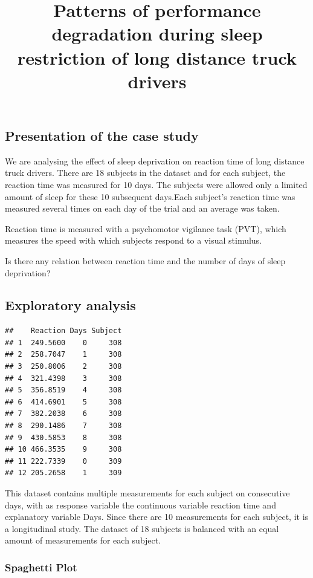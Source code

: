 \documentclass[
]{article}
\title{Patterns of performance degradation during sleep restriction of
long distance truck drivers}
\author{}
\date{}
\begin{document}
\maketitle

\hypertarget{presentation-of-the-case-study}{%
\subsection{Presentation of the case
study}\label{presentation-of-the-case-study}}

We are analysing the effect of sleep deprivation on reaction time of
long distance truck drivers. There are 18 subjects in the dataset and
for each subject, the reaction time was measured for 10 days. The
subjects were allowed only a limited amount of sleep for these 10
subsequent days.Each subject's reaction time was measured several times
on each day of the trial and an average was taken.

Reaction time is measured with a psychomotor vigilance task (PVT), which
measures the speed with which subjects respond to a visual stimulus.

Is there any relation between reaction time and the number of days of
sleep deprivation?

\hypertarget{exploratory-analysis}{%
\subsection{Exploratory analysis}\label{exploratory-analysis}}

\begin{verbatim}
##    Reaction Days Subject
## 1  249.5600    0     308
## 2  258.7047    1     308
## 3  250.8006    2     308
## 4  321.4398    3     308
## 5  356.8519    4     308
## 6  414.6901    5     308
## 7  382.2038    6     308
## 8  290.1486    7     308
## 9  430.5853    8     308
## 10 466.3535    9     308
## 11 222.7339    0     309
## 12 205.2658    1     309
\end{verbatim}

This dataset contains multiple measurements for each subject on
consecutive days, with as response variable the continuous variable
reaction time and explanatory variable Days. Since there are 10
measurements for each subject, it is a longitudinal study. The dataset
of 18 subjects is balanced with an equal amount of measurements for each
subject.

\hypertarget{spaghetti-plot}{%
\subsubsection{Spaghetti Plot}\label{spaghetti-plot}}
\end{document}
